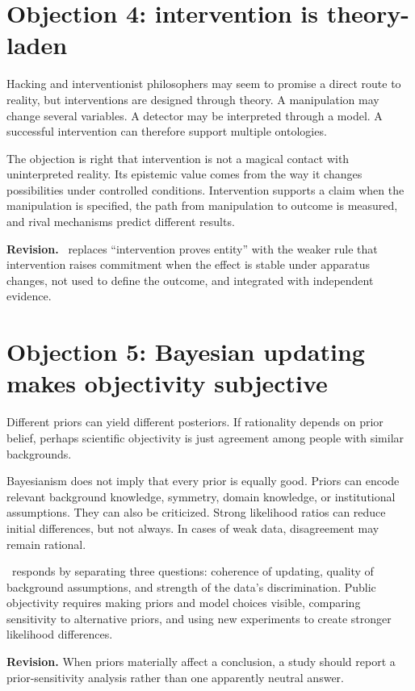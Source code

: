 \section{Objection 4: intervention is theory-laden}

Hacking and interventionist philosophers may seem to promise a direct route to
reality, but interventions are designed through theory. A manipulation may
change several variables. A detector may be interpreted through a model. A
successful intervention can therefore support multiple ontologies.

The objection is right that intervention is not a magical contact with
uninterpreted reality. Its epistemic value comes from the way it changes
possibilities under controlled conditions. Intervention supports a claim when
the manipulation is specified, the path from manipulation to outcome is
measured, and rival mechanisms predict different results.

\textbf{Revision.} \RCR\ replaces \enquote{intervention proves entity} with the
weaker rule that intervention raises commitment when the effect is stable under
apparatus changes, not used to define the outcome, and integrated with
independent evidence.

\section{Objection 5: Bayesian updating makes objectivity subjective}

Different priors can yield different posteriors. If rationality depends on
prior belief, perhaps scientific objectivity is just agreement among people
with similar backgrounds.

Bayesianism does not imply that every prior is equally good. Priors can encode
relevant background knowledge, symmetry, domain knowledge, or institutional
assumptions. They can also be criticized. Strong likelihood ratios can reduce
initial differences, but not always. In cases of weak data, disagreement may
remain rational.

\RCR\ responds by separating three questions: coherence of updating, quality of
background assumptions, and strength of the data's discrimination. Public
objectivity requires making priors and model choices visible, comparing
sensitivity to alternative priors, and using new experiments to create stronger
likelihood differences.

\textbf{Revision.} When priors materially affect a conclusion, a study should
report a prior-sensitivity analysis rather than one apparently neutral answer.

